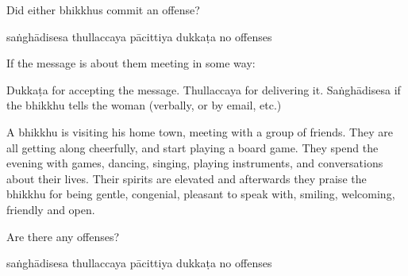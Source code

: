 \begin{exam}{\autoExamName}
\begin{problem*}
\begin{parts}
    Did either bhikkhus commit an offense?

    \bigskip

    \begin{answers}{5}
      \bChoices
       saṅghādisesa\eAns
       thullaccaya\eAns
       pācittiya\eAns
       dukkaṭa\eAns
       no offenses\eAns
      \eChoices
    \end{answers}

    \begin{solution}
      If the message is about them meeting in some way:

      Dukkaṭa for accepting the message.
      Thullaccaya for delivering it.
      Saṅghādisesa if the bhikkhu tells the woman (verbally, or by email, etc.)
    \end{solution}

  \end{parts}

\end{problem*}

\ifnosolutions
\clearpage
\else
\problemDivide
\fi

\begin{problem}

  A bhikkhu is visiting his home town, meeting with a group of friends.
  They are all getting along cheerfully, and start playing a board game.
  They spend the evening with games, dancing, singing, playing instruments, and conversations about their lives.
  Their spirits are elevated and afterwards they praise the bhikkhu for being
  gentle, congenial, pleasant to speak with, smiling, welcoming, friendly and open.

  Are there any offenses?

  \bigskip

  \begin{answers}{5}
    \bChoices
     saṅghādisesa\eAns
     thullaccaya\eAns
     pācittiya\eAns
     dukkaṭa\eAns
     no offenses\eAns
    \eChoices
  \end{answers}

\end{problem}

\end{exam}

